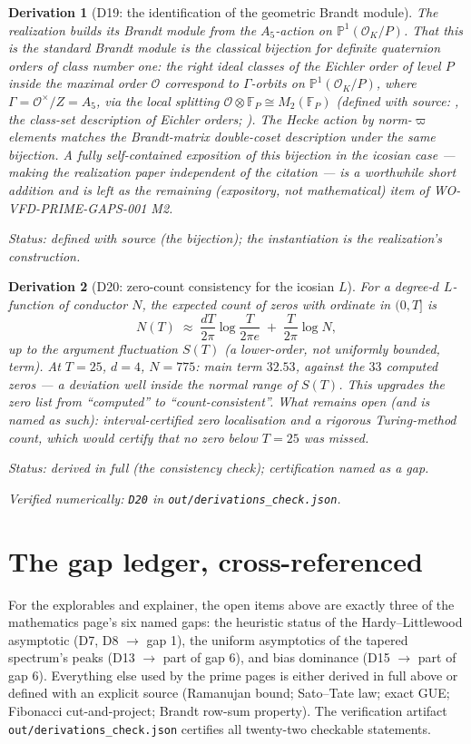 \documentclass[11pt]{article}
\newtheorem{deriv}{Derivation}
\theoremstyle{remark}
\newcommand{\bucket}[1]{\par\smallskip\noindent\textit{Status: #1.}}
\newcommand{\chk}[1]{\par\noindent\textit{Verified numerically:
\texttt{#1} in \texttt{out/derivations\_check.json}.}}
\begin{document}
\begin{deriv}[D19: the identification of the geometric Brandt
module]\label{d19}
The realization builds its Brandt module from the $A_5$-action on
$\mathbb{P}^1(\mathcal{O}_K/P)$. That this \emph{is} the standard
Brandt module is the classical bijection for definite quaternion
orders of class number one: the right ideal classes of the Eichler
order of level $P$ inside the maximal order $\mathcal{O}$ correspond
to $\Gamma$-orbits on $\mathbb{P}^1(\mathcal{O}_K/P)$, where
$\Gamma = \mathcal{O}^\times/Z = A_5$, via the local splitting
$\mathcal{O} \otimes \mathbb{F}_P \cong M_2(\mathbb{F}_P)$ (defined with source: \cite{Voight}, the class-set description of
Eichler orders; \cite{Eichler}). The Hecke action by
norm-$\varpi$ elements matches the Brandt-matrix double-coset
description under the same bijection. A fully self-contained
exposition of this bijection in the icosian case --- making the
realization paper independent of the citation --- is a worthwhile
short addition and is left as the remaining (expository, not
mathematical) item of WO-VFD-PRIME-GAPS-001 M2.
\bucket{defined with source (the bijection); the instantiation is the
realization's construction}
\end{deriv}

\begin{deriv}[D20: zero-count consistency for the icosian
$L$]\label{d20}
For a degree-$d$ $L$-function of conductor $N$, the expected count of
zeros with ordinate in $(0, T]$ is
\[
N(T) \;\approx\; \frac{dT}{2\pi}\log\frac{T}{2\pi e}
\;+\; \frac{T}{2\pi}\log N,
\]
up to the argument fluctuation $S(T)$ (a lower-order, not uniformly
bounded, term). At $T = 25$, $d = 4$,
$N = 775$: main term $32.53$, against the $33$ computed zeros --- a
deviation well inside the normal range of $S(T)$. This upgrades the
zero list from ``computed'' to ``count-consistent''. What remains open
(and is named as such): interval-certified zero localisation and a
rigorous Turing-method count, which would certify that no zero below
$T = 25$ was missed.
\bucket{derived in full (the consistency check); certification named
as a gap}\chk{D20}
\end{deriv}

\section{The gap ledger, cross-referenced}

For the explorables and explainer, the open items above are exactly
three of the mathematics page's six named gaps: the heuristic status of
the Hardy--Littlewood asymptotic (D7, D8 $\to$ gap 1), the uniform
asymptotics of the tapered spectrum's peaks (D13 $\to$ part of gap 6),
and bias dominance (D15 $\to$ part of gap 6). Everything else used by
the prime pages is either derived in full above or defined with an
explicit source (Ramanujan bound; Sato--Tate law; exact GUE; Fibonacci
cut-and-project; Brandt row-sum property). The verification artifact
\texttt{out/derivations\_check.json} certifies all twenty-two checkable
statements.
\end{document}
